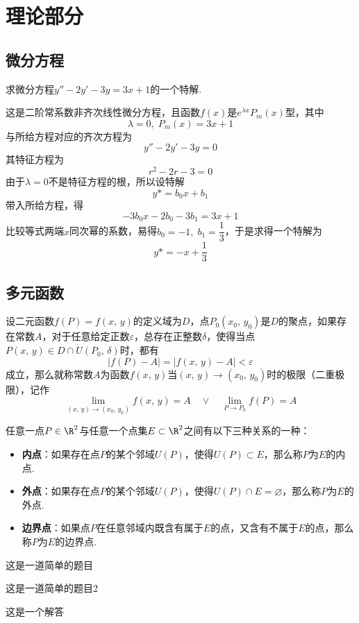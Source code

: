 \documentclass[12pt, a4paper, oneside, UTF8]{ctexbook}
\begin{document}
\else
\fi
\chapter{理论部分}

\section{微分方程}
\begin{example}
    求微分方程$y''-2y'-3y=3x+1$的一个特解.
\end{example}
\begin{solution}
    这是二阶常系数非齐次线性微分方程，且函数$f(x)$是$e^{\lambda{x}}P_m(x)$型，其中
    \[
        \lambda = 0,\;P_m(x) = 3x+1
    \]
    与所给方程对应的齐次方程为
    \[
        y''-2y'-3y=0
    \]
    其特征方程为
    \[
        r^2-2r-3 = 0
    \]
    由于$\lambda = 0$不是特征方程的根，所以设特解
    \[
        y* = b_0 x + b_1
    \]
    带入所给方程，得
    \[
        -3b_0 x - 2b_0 - 3b_1 = 3x+1
    \]
    比较等式两端$x$同次幂的系数，易得$b_0 = -1,\;b_1 = \dfrac{1}{3}$，于是求得一个特解为
    \[
        y* = -x + \frac{1}{3}
    \]
\end{solution}

\section{多元函数}
\begin{defn}
    设二元函数$f(P) = f(x,\,y)$的定义域为$D$，点$P_0(x_0,\,y_0)$是$D$的聚点，如果存在常数$A$，对于任意给定正数$\varepsilon$，总存在正整数$\delta$，使得当点$P(x,\,y) \in D \cap \mathring{U}(P_0,\,\delta)$时，都有
    \[
        |f(P)-A| = |f(x,\,y) - A| < \varepsilon
    \]
    成立，那么就称常数$A$为函数$f(x,\,y)$当$(x,\,y) \to (x_0,\,y_0)$时的极限（二重极限），记作
    \[
        \lim_{(x,\,y) \to (x_0,\,y_0)}f(x,\,y) = A \quad \lor \quad \lim_{P \to P_0}f(P) = A
    \]
\end{defn}


任意一点$P \in \R^2$与任意一个点集$E \subset \R^2$之间有以下三种关系的一种：
\begin{itemize}[leftmargin=45pt]
    \item \textbf{内点}：如果存在点$P$的某个邻域$U(P)$，使得$U(P) \subset E$，那么称$P$为$E$的内点.
    \item \textbf{外点}：如果存在点$P$的某个邻域$U(P)$，使得$U(P) \cap E = \varnothing$，那么称$P$为$E$的外点.
    \item \textbf{边界点}：如果点$P$在任意邻域内既含有属于$E$的点，又含有不属于$E$的点，那么称$P$为$E$的边界点.
\end{itemize}

\begin{problem}
这是一道简单的题目
\end{problem}

\begin{problem}
    这是一道简单的题目2
    \end{problem}
\begin{answer}
    这是一个解答
\end{answer}

\ifx\allfiles\undefined
\end{document}
